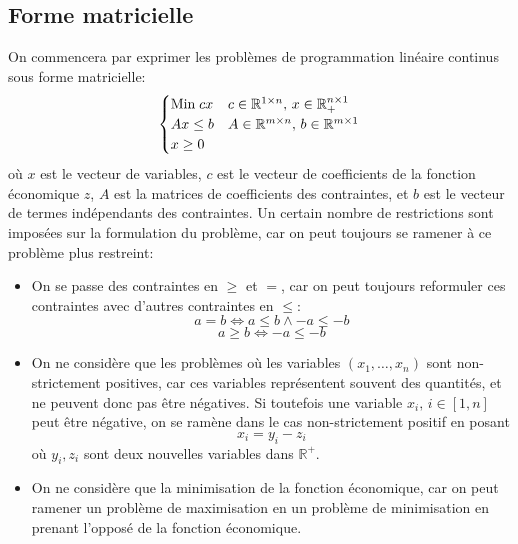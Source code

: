 \documentclass[a4paper]{report}
\begin{document}
\subsection{Forme matricielle}
On commencera par exprimer les problèmes de programmation linéaire continus sous
forme matricielle:
\[\begin{cases}
	\text{Min\;} cx & c\in\mathbb{R}^{1\times n},\, x\in\mathbb{R}^{n\times 1}_+
	\\
	Ax \le b        & A\in\mathbb{R}^{m\times n},\, b\in\mathbb{R}^{m\times 1}
	\\
	x \ge 0
\end{cases}\]
où \(x\) est le vecteur de variables, \(c\) est le vecteur de coefficients de
la fonction économique \(z\), \(A\) est la matrices de coefficients des
contraintes, et \(b\) est le vecteur de termes indépendants des contraintes.
Un certain nombre de restrictions sont imposées sur la formulation du problème,
car on peut toujours se ramener à ce problème plus restreint:
\begin{itemize}
	\item On se passe des contraintes en \(\ge\) et \(=\), car on peut
	toujours reformuler ces contraintes avec d'autres contraintes en \(\le\):
	\[a=b\Leftrightarrow a\le b\land -a\le-b\]
	\[a\ge b\Leftrightarrow -a\le-b\]

	\item On ne considère que les  problèmes où les variables
	\((x_1,\dots,x_n)\) sont non-strictement positives, car ces variables
	représentent souvent des quantités, et ne peuvent donc pas être négatives. Si
	toutefois une variable \(x_i,\,i\in[1,n]\) peut être négative, on se ramène dans
	le cas non-strictement positif en posant
	\[x_i=y_i-z_i\]
	où \(y_i,z_i\) sont deux nouvelles variables dans \(\mathbb{R}^+\).

	\item On ne considère que la minimisation de la fonction
	économique, car on peut ramener un problème de maximisation en un
	problème de minimisation en prenant l'opposé de la fonction économique.
\end{itemize}
\end{document}

